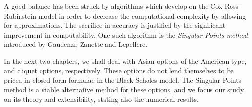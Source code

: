 A good balance has been struck by algorithms which develop on the Cox-Ross-Rubinstein model in order to decrease the computational complexity by allowing for approximations. The sacrifice in accuracy is justified by the significant improvement in computability. One such algorithm is the \emph{Singular Points method} introduced by Gaudenzi, Zanette and Lepellere. 

In the next two chapters, we shall deal with Asian options of the American type, and cliquet options, respectively. These options do not lend themselves to be priced in closed-form formulae in the Black-Scholes model. The Singular Points method is a viable alternative method for these options, and we focus our study on its theory and extensibility, stating also the numerical results.


